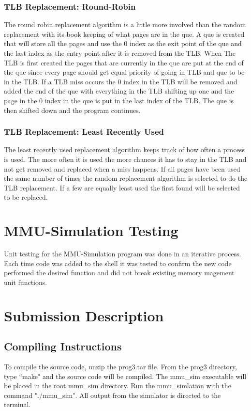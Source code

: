 \begin{multicols}{2}
\subsubsection{TLB Replacement: Round-Robin}
The round robin replacement algorithm is a little more involved than the random replacement with its book keeping of what pages are in the que. A que is created that will store all the pages and use the 0 index as the exit point of the que and the last index as the entry point after it is removed from the TLB. When The TLB is first created the pages that are currently in the que are put at the end of the que since every page should get equal priority of going in TLB and que to be in the TLB. If a TLB miss occurs the 0 index in the TLB will be removed and added the end of the que with everything in the TLB shifting up one and the page in the 0 index in the que is put in the last index of the TLB. The que is then shifted down and the program continues. 

\subsubsection{TLB Replacement: Least Recently Used}
The least recently used replacement algorithm keeps track of how often a process is used. The more often it is used the more chances it has to stay in the TLB and not get removed and replaced when a miss happens. If all pages have been used the same number of times the random replacement algorithm is selected to do the TLB replacement. If a few are equally least used the first found will be selected to be replaced. 

\section{MMU-Simulation Testing}\label{testing}
Unit testing for the MMU-Simulation program was done in an iterative process. Each time code was added to the shell it was tested to confirm the new code performed the desired function and did not break existing memory magement unit functions. 

\section{Submission Description}\label{submission_description}
\subsection{Compiling Instructions}
To compile the source code, unzip the prog3.tar file. From the prog3 directory, type ``make" and the source code will be compiled. The mmu\_sim executable will be placed in the root mmu\_sim directory. Run the mmu\_simlation with the command "./mmu\_sim". All output from the simulator is directed to the terminal.


\end{multicols}
